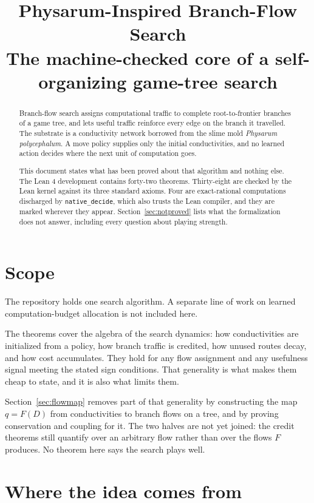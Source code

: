 \documentclass[11pt,a4paper]{article}
\title{Physarum-Inspired Branch-Flow Search\\
\large The machine-checked core of a self-organizing game-tree search}
\author{}
\date{}
\theoremstyle{definition}
\newcommand{\lean}[1]{\texttt{#1}}
\begin{document}
\maketitle

\begin{abstract}
\noindent
Branch-flow search assigns computational traffic to complete root-to-frontier
branches of a game tree, and lets useful traffic reinforce every edge on the
branch it travelled. The substrate is a conductivity network borrowed from the
slime mold \emph{Physarum polycephalum}. A move policy supplies only the
initial conductivities, and no learned action decides where the next unit of
computation goes.

This document states what has been proved about that algorithm and nothing
else. The Lean 4 development contains forty-two theorems. Thirty-eight are
checked by the Lean kernel against its three standard axioms. Four are
exact-rational computations discharged by \lean{native\_decide}, which also
trusts the Lean compiler, and they are marked wherever they appear.
Section~\ref{sec:notproved} lists what the formalization does not answer,
including every question about playing strength.
\end{abstract}

\section{Scope}

The repository holds one search algorithm. A separate line of work on learned
computation-budget allocation is not included here.

The theorems cover the algebra of the search dynamics: how conductivities are
initialized from a policy, how branch traffic is credited, how unused routes
decay, and how cost accumulates. They hold for any flow assignment and any
usefulness signal meeting the stated sign conditions. That generality is what
makes them cheap to state, and it is also what limits them.

Section~\ref{sec:flowmap} removes part of that generality by constructing the
map $q = F(D)$ from conductivities to branch flows on a tree, and by proving
conservation and coupling for it. The two halves are not yet joined: the credit
theorems still quantify over an arbitrary flow rather than over the flows $F$
produces. No theorem here says the search plays well.

\section{Where the idea comes from}
\end{document}
